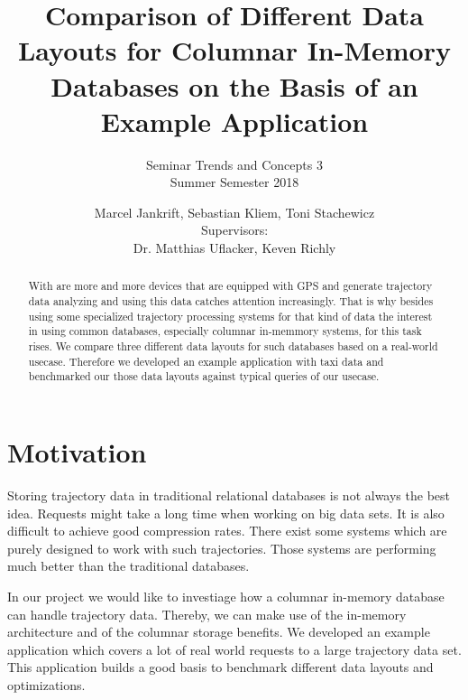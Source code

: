 \documentclass[10pt]{sig-alternate}
\begin{document}

\title{
  \vspace{24pt}
  Comparison of Different Data Layouts for Columnar In-Memory Databases on the Basis of an Example Application
}
\subtitle{
  Seminar Trends and Concepts 3\\
  Summer Semester 2018
}


\author{
  Marcel Jankrift, Sebastian Kliem, Toni Stachewicz\\[12pt]
  Supervisors:\\
  Dr. Matthias Uflacker, Keven Richly
}


\maketitle
\begin{abstract}
With are more and more devices that are equipped with GPS and generate trajectory data analyzing and using this data catches attention increasingly. That is why besides using some specialized trajectory processing systems for that kind of data the interest in using common databases, especially columnar in-memmory systems, for this task rises. We compare three different data layouts for such databases based on a real-world usecase. Therefore we developed an example application with taxi data and benchmarked our those data layouts against typical queries of our usecase.
\end{abstract}


\section{Motivation}

Storing trajectory data in traditional relational databases is not always the best idea. Requests might take a long time when working on big data sets. It is also difficult to achieve good compression rates. There exist some systems which are purely designed to work with such trajectories. Those systems are performing much better than the traditional databases.

In our project we would like to investiage how a columnar in-memory database can handle trajectory data. Thereby, we can make use of the in-memory architecture and of the columnar storage benefits. We developed an example application which covers a lot of real world requests to a large trajectory data set. This application builds a good basis to benchmark different data layouts and optimizations.
\end{document}
